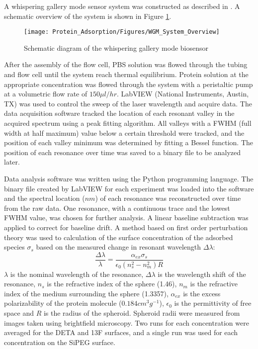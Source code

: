 A whispering gallery mode sensor system was constructed as described
in \cite{Wilson2011,Wilson2009}. A schematic overview of the system
is shown in Figure \ref{fig:WGM System Diagram}.%
\begin{figure}
\texttt{[image: Protein\_Adsorption/Figures/WGM\_System\_Overview]}

\caption{\label{fig:WGM System Diagram}Schematic diagram of the whispering
gallery mode biosensor}


%
\end{figure}
 After the assembly of the flow cell, PBS solution was flowed through
the tubing and flow cell until the system reach thermal equilibrium.
Protein solution at the appropriate concentration was flowed through
the system with a peristaltic pump at a volumetric flow rate of $150\mu l/hr$.
LabVIEW (National Instruments, Austin, TX) was used to control the
sweep of the laser wavelength and acquire data. The data acquisition
software tracked the location of each resonant valley in the acquired
spectrum using a peak fitting algorithm. All valleys with a FWHM (full
width at half maximum) value below a certain threshold were tracked,
and the position of each valley minimum was determined by fitting
a Bessel function. The position of each resonance over time was saved
to a binary file to be analyzed later.

Data analysis software was written using the Python programming language.
The binary file created by LabVIEW for each experiment was loaded
into the software and the spectral location ($nm$) of each resonance
was reconstructed over time from the raw data. One resonance, with
a continuous trace and the lowest FWHM value, was chosen for further
analysis. A linear baseline subtraction was applied to correct for
baseline drift. A method based on first order perturbation theory
\cite{Vollmer2002,Arnold2003} was used to calculation of the surface
concentration of the adsorbed species $\sigma_{s}$ based on the measured
change in resonant wavelength $\Delta\lambda$:\begin{equation}
\frac{\Delta\lambda}{\lambda}=\frac{\alpha_{ex}\sigma_{s}}{\epsilon_{0}\left(n_{s}^{2}-n_{m}^{2}\right)R}\label{eq:WGM data analysis}\end{equation}
$\lambda$ is the nominal wavelength of the resonance, $\Delta\lambda$
is the wavelength shift of the resonance, $n_{s}$ is the refractive
index of the sphere (1.46), $n_{m}$ is the refractive index of the
medium surrounding the sphere (1.3357), $\alpha_{ex}$ is the excess
polarizability of the protein molecule ($0.184cm^{3}g^{-1}$), $\epsilon_{0}$
is the permittivity of free space and $R$ is the radius of the spheroid.
Spheroid radii were measured from images taken using brightfield microscopy.
Two runs for each concentration were averaged for the DETA and 13F
surfaces, and a single run was used for each concentration on the
SiPEG surface.


